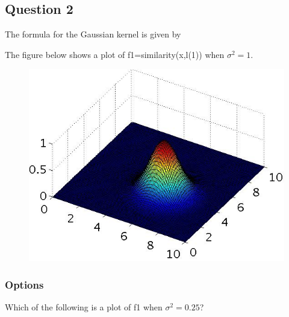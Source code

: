 \documentclass[11pt]{article} %
\begin{document}
\subsection*{Question 2}
The formula for the Gaussian kernel is given by %

The figure below shows a plot of f1=similarity(x,l(1)) when $\sigma^2 = 1$.

\begin{figure}
	\centering
	\includegraphics[width=0.7\linewidth]{images/SVM2}
\end{figure}
\subsubsection{Options}
Which of the following is a plot of f1 when $\sigma^2 = 0.25$?
\end{document}
